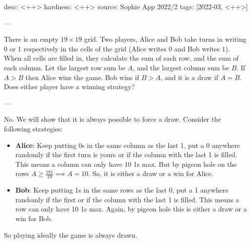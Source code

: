desc: <++>
hardness: <++>
source: Sophie App 2022/2
tags: [2022-03, <++>]

---

There is an empty $19 \times 19$ grid. Two players, Alice and Bob take turns in writing $0$ or $1$ respectively in the cells of the grid (Alice writes $0$ and Bob writes $1$). When all cells are filled in, they calculate the sum of each row, and the sum of each column. Let the largest row sum be $A$, and the largest column sum be $B$. If $A > B$ then Alice wins the game. Bob wins if $B > A$, and it is a draw if $A=B$. Does either player have a winning strategy?

---

No. We will show that it is always possible to force a draw.
Consider the following strategies:
\begin{itemize}
    \item \textbf{Alice}: Keep putting 0s in the same column as the last 1, put a 0 anywhere randomly if the first turn is yours 
      or if the column with the last 1 is filled. This means a column can only have 10 1s max. But by pigeon hole on the rows 
      $A \geq  \frac{181}{19} \implies A = 10$. So, it is either a draw or a win for Alice.
    \item \textbf{Bob}: Keep putting 1s in the same rows as the last 0, put a 1 anywhere randomly if the first or if the column 
      with the last 1 is filled. This means a row can only have 10 1s max. Again, by pigeon hole this is either a draw or a win for Bob.
\end{itemize}
So playing ideally the game is always drawn.
